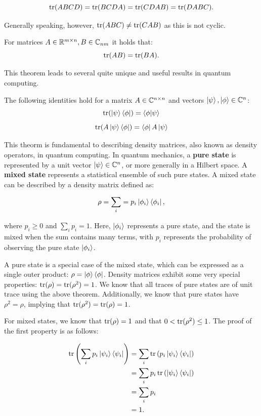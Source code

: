 \documentclass[12pt]{article}
\begin{document}
$$\operatorname{tr}(ABCD) = \operatorname{tr}(BCDA) = \operatorname{tr}(CDAB) = \operatorname{tr}(DABC).$$

Generally speaking, however, $\operatorname{tr}(ABC) \neq \operatorname{tr}(CAB)$ as this is not cyclic. 

\begin{theorem}
    For matrices $A \in \mathbb{R}^{m \times n}, B \in \mathbb{C}_{nm}$ it holds that:
    $$\operatorname{tr}(AB) = \operatorname{tr}(BA).$$
\end{theorem}

This theorem leads to several quite unique and useful results in quantum computing. 

\begin{theorem}
    The following identities hold for a matrix $A \in \mathbb{C}^{n \times n}$ and vectors $\ket{\psi}, \ket{\phi} \in \mathbb{C}^n$:
    $$\operatorname{tr}(\ket{\psi} \bra{\phi}) = \braket{\phi}{\psi}$$ 
    $$\operatorname{tr}(A\ket{\psi} \bra{\phi}) = \bra{\phi} A \ket{\psi}$$
\end{theorem}

This theorm is fundamental to describing density matrices, also known as density operators, in quantum computing. In quantum mechanics, a \textbf{pure state} is represented by a unit vector $\ket{\psi} \in \mathbb{C}^n$, or more generally in a Hilbert space. A \textbf{mixed state} represents a statistical ensemble of such pure states. A mixed state can be described by a density matrix defined as:

$$\rho = \sum_{i} = p_i \ket{\phi_i} \bra{\phi_i},$$

where $p_i \geq 0$ and $\sum_{i} p_i = 1$. Here, $\ket{\phi_i}$ represents a pure state, and the state is mixed when the sum contains many terms, with $p_i$ represents the probability of observing the pure state $\ket{\phi_i}$. 

A pure state is a special case of the mixed state, which can be expressed as a single outer product: $\rho = \ket{\phi} \bra{\phi}$. Density matrices exhibit some very special properties: $\operatorname{tr}(\rho) = \operatorname{tr}(\rho^2) = 1$. We know that all traces of pure states are of unit trace using the above theorem. Additionally, we know that pure states have $\rho^2 = \rho$, implying that $\operatorname{tr}(\rho^2) = \operatorname{tr}(\rho) = 1$. 

For mixed states, we know that $\operatorname{tr}(\rho) = 1$ and that $0 < \operatorname{tr}(\rho^2) \leq 1$. The proof of the first property is as follows:

\begin{align*}
    \operatorname{tr}\left(\sum_{i} p_i \ket{\psi_i} \bra{\psi_i}\right) &= \sum_{i} \operatorname{tr}\left( p_i \ket{\psi_i} \bra{\psi_i}\right) \\
    &= \sum_{i} p_i \operatorname{tr}\left(  \ket{\psi_i} \bra{\psi_i}\right) \\
    &= \sum_{i} p_i \\
    &= 1.\\
\end{align*}
\end{document}
